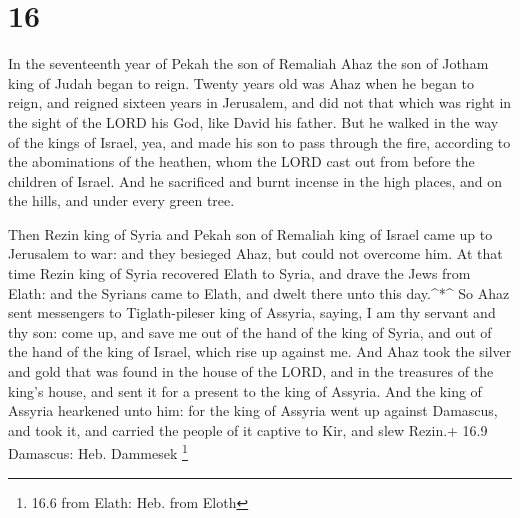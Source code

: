 \hypertarget{section-15}{%
\section{16}\label{section-15}}

 In the seventeenth year of Pekah the son of Remaliah Ahaz
the son of Jotham king of Judah began to reign.  Twenty
years old was Ahaz when he began to reign, and reigned sixteen years in
Jerusalem, and did not that which was right in the sight of the LORD his
God, like David his father.  But he walked in the way of the
kings of Israel, yea, and made his son to pass through the fire,
according to the abominations of the heathen, whom the LORD cast out
from before the children of Israel.  And he sacrificed and
burnt incense in the high places, and on the hills, and under every
green tree.

 Then Rezin king of Syria and Pekah son of Remaliah king of
Israel came up to Jerusalem to war: and they besieged Ahaz, but could
not overcome him.  At that time Rezin king of Syria
recovered Elath to Syria, and drave the Jews from Elath: and the Syrians
came to Elath, and dwelt there unto this day.\^{}*\^{}  So
Ahaz sent messengers to Tiglath-pileser king of Assyria, saying, I am
thy servant and thy son: come up, and save me out of the hand of the
king of Syria, and out of the hand of the king of Israel, which rise up
against me.  And Ahaz took the silver and gold that was
found in the house of the LORD, and in the treasures of the king's
house, and sent it for a present to the king of Assyria. 
And the king of Assyria hearkened unto him: for the king of Assyria went
up against Damascus, and took it, and carried the people of it captive
to Kir, and slew Rezin.+ 16.9 Damascus: Heb. Dammesek \footnote{16.6
  from Elath: Heb. from Eloth}

